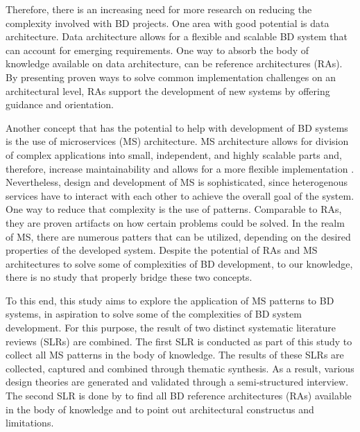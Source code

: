 \documentclass{bmcart}
\begin{document}
Therefore, there is an increasing need for more research on reducing the complexity involved with BD projects. One area with good potential is data architecture. Data architecture allows for a flexible and scalable BD system that can account for emerging requirements. One way to absorb the body of knowledge available on data architecture, can be reference architectures (RAs). By presenting proven ways to solve common implementation challenges on an architectural level, RAs support the development of new systems by offering guidance and orientation.





% 


Another concept that has the potential to help with development of BD systems is the use of microservices (MS) architecture. MS architecture allows for division of complex applications into small, independent, and highly scalable parts and, therefore, increase maintainability and allows for a more flexible implementation \cite{Richardson.2022}. Nevertheless, design and development of MS is sophisticated, since heterogenous services have to interact with each other to achieve the overall goal of the system. One way to reduce that complexity is the use of patterns. Comparable to RAs, they are proven artifacts on how certain problems could be solved. In the realm of MS, there are numerous patters that can be utilized, depending on the desired properties of the developed system. Despite the potential of RAs and MS architectures to solve some of complexities of BD development, to our knowledge, there is no study that properly bridge these two concepts. 


To this end, this study aims to explore the application of MS patterns to BD systems, in aspiration to solve some of the complexities of BD system development. For this purpose, the result of two distinct systematic literature reviews (SLRs) are combined. The first SLR is conducted as part of this study to collect all MS patterns in the body of knowledge. The results of these SLRs are collected, captured and combined through thematic synthesis. As a result, various design theories are generated and validated through a semi-structured interview. The second SLR is done by \cite{ataei2022state} to find all BD reference architectures (RAs) available in the body of knowledge and to point out architectural constructus and limitations. 
\end{document}
